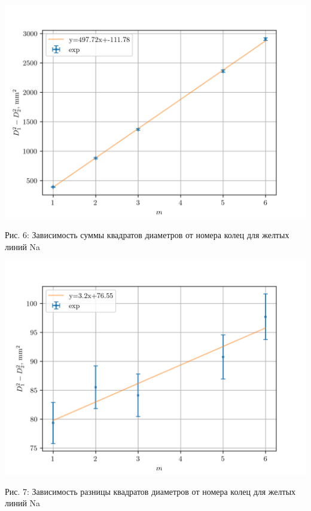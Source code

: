 \documentclass[12pt]{article}
\begin{document}
    \begin{minipage}{0.4\linewidth}
        \includegraphics[width=\linewidth]{pic/Na(1)}
        \label{fig:fig6}
        \caption{Рис. 6: Зависимость суммы квадратов диаметров от номера колец для желтых линий Na}
    \end{minipage}
    \hfill
    \begin{minipage}{0.4\linewidth}
        \includegraphics[width=\linewidth]{pic/Na}
        \label{fig:fig7}
        \caption{Рис. 7: Зависимость разницы квадратов диаметров от номера колец для желтых линий Na}
    \end{minipage}
\end{document}
